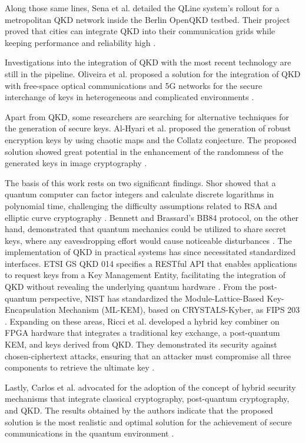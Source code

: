 \documentclass[conference]{IEEEtran}
\begin{document}
Along those same lines, Sena et al. detailed the QLine system's rollout for a metropolitan QKD network inside the Berlin OpenQKD testbed. Their project proved that cities can integrate QKD into their communication grids while keeping performance and reliability high \cite{b7}.

Investigations into the integration of QKD with the most recent technology are still in the pipeline. Oliveira et al. proposed a solution for the integration of QKD with free-space optical communications and 5G networks for the secure interchange of keys in heterogeneous and complicated environments \cite{b8}.

Apart from QKD, some researchers are searching for alternative techniques for the generation of secure keys. Al-Hyari et al. proposed the generation of robust encryption keys by using chaotic maps and the Collatz conjecture. The proposed solution showed great potential in the enhancement of the randomness of the generated keys in image cryptography \cite{b9}.

The basis of this work rests on two significant findings. Shor showed that a quantum computer can factor integers and calculate discrete logarithms in polynomial time, challenging the difficulty assumptions related to RSA and elliptic curve cryptography \cite{b11}. Bennett and Brassard's BB84 protocol, on the other hand, demonstrated that quantum mechanics could be utilized to share secret keys, where any eavesdropping effort would cause noticeable disturbances \cite{b12}. The implementation of QKD in practical systems has since necessitated standardized interfaces. ETSI GS QKD 014 specifies a RESTful API that enables applications to request keys from a Key Management Entity, facilitating the integration of QKD without revealing the underlying quantum hardware \cite{b13}. From the post-quantum perspective, NIST has standardized the Module-Lattice-Based Key-Encapsulation Mechanism (ML-KEM), based on CRYSTALS-Kyber, as FIPS 203 \cite{b14}. Expanding on these areas, Ricci et al. developed a hybrid key combiner on FPGA hardware that integrates a traditional key exchange, a post-quantum KEM, and keys derived from QKD. They demonstrated its security against chosen-ciphertext attacks, ensuring that an attacker must compromise all three components to retrieve the ultimate key \cite{b15}.

Lastly, Carlos et al. advocated for the adoption of the concept of hybrid security mechanisms that integrate classical cryptography, post-quantum cryptography, and QKD. The results obtained by the authors indicate that the proposed solution is the most realistic and optimal solution for the achievement of secure communications in the quantum environment \cite{b10}.
\end{document}
